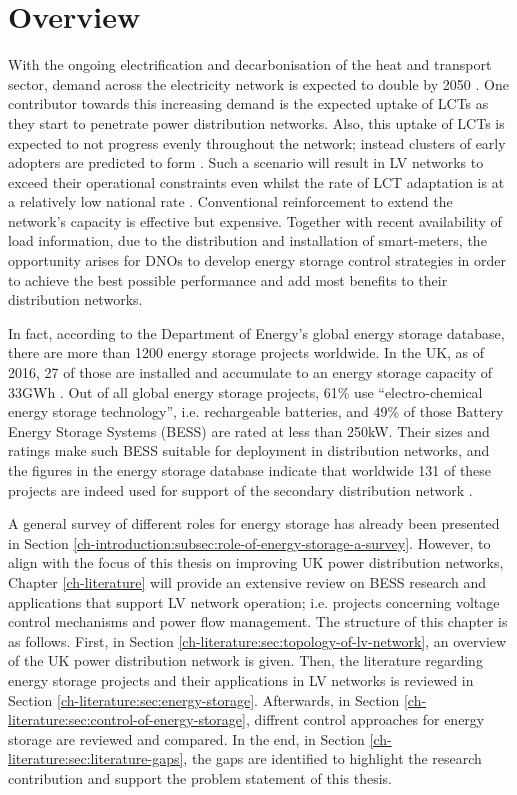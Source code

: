 \section{Overview}
\label{ch-literature:sec:overview}

With the ongoing electrification and decarbonisation of the heat and transport sector, demand across the electricity network is expected to double by 2050 \cite{Wilks2010}.
One contributor towards this increasing demand is the expected uptake of LCTs as they start to penetrate power distribution networks.
Also, this uptake of LCTs is expected to not progress evenly throughout the network; instead clusters of early adopters are predicted to form \cite{Poghosyan2014}.
Such a scenario will result in LV networks to exceed their operational constraints even whilst the rate of LCT adaptation is at a relatively low national rate \cite{Poghosyan2014}.
Conventional reinforcement to extend the network's capacity is effective but expensive.
Together with recent availability of load information, due to the distribution and installation of smart-meters, the opportunity arises for DNOs to develop energy storage control strategies in order to achieve the best possible performance and add most benefits to their distribution networks.

In fact, according to the Department of Energy's global energy storage database, there are more than 1200 energy storage projects worldwide.
In the UK, as of 2016, 27 of those are installed and accumulate to an energy storage capacity of 33GWh \cite{Garton2016}.
Out of all global energy storage projects, 61\% use ``electro-chemical energy storage technology'', i.e. rechargeable batteries, and 49\% of those Battery Energy Storage Systems (BESS) are rated at less than 250kW.
Their sizes and ratings make such BESS suitable for deployment in distribution networks, and the figures in the energy storage database indicate that worldwide 131 of these projects are indeed used for support of the secondary distribution network \cite{DOE-GESD}.

A general survey of different roles for energy storage has already been presented in Section \ref{ch-introduction:subsec:role-of-energy-storage-a-survey}.
However, to align with the focus of this thesis on improving UK power distribution networks, Chapter \ref{ch-literature} will provide an extensive review on BESS research and applications that support LV network operation; i.e. projects concerning voltage control mechanisms and power flow management.
The structure of this chapter is as follows.
First, in Section \ref{ch-literature:sec:topology-of-lv-network}, an overview of the UK power distribution network is given.
Then, the literature regarding energy storage projects and their applications in LV networks is reviewed in Section \ref{ch-literature:sec:energy-storage}.
Afterwards, in Section \ref{ch-literature:sec:control-of-energy-storage}, diffrent control approaches for energy storage are reviewed and compared.
In the end, in Section \ref{ch-literature:sec:literature-gaps}, the gaps are identified to highlight the research contribution and support the problem statement of this thesis.
